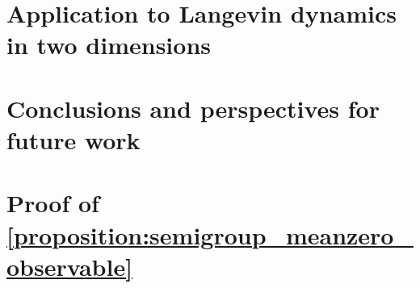\documentclass[11pt,a4paper]{article}
\newcommand{\expect}[0]{\mathbf{E}}
\theoremstyle{plain}
\numberwithin{equation}{section}
\begin{document}

\section{Application to Langevin dynamics in two dimensions}%
\label{sec:applications_2d}%



\section{Conclusions and perspectives for future work}%
\label{sec:conclusions_and_perspectives_for_future_work}

\appendix
\section{Proof of \cref{proposition:semigroup_meanzero_observable}}%
\label{sec:auxiliary_technical_results}
\end{document}
